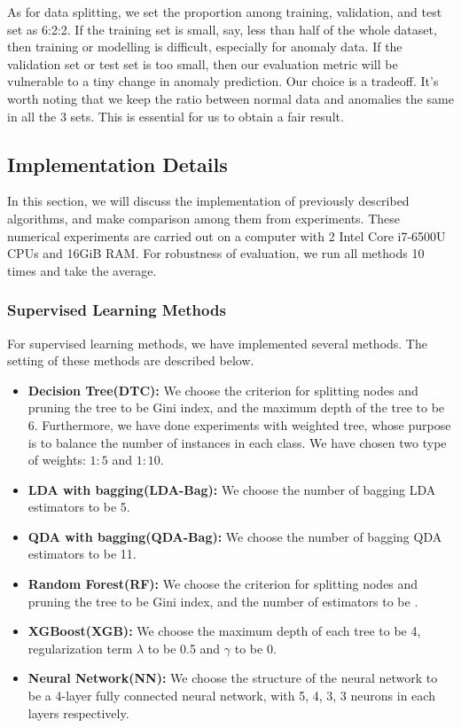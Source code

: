 \documentclass[english]{article}
\begin{document}
\par As for data splitting, we set the proportion among training, validation, and test set as 6:2:2. If the training set is small, say, less than half of the whole dataset, then training or modelling is difficult, especially for anomaly data. If the validation set or test set is too small, then our evaluation metric will be vulnerable to a tiny change in anomaly prediction. Our choice is a tradeoff. It's worth noting that we keep the ratio between normal data and anomalies the same in all the 3 sets. This is essential for us to obtain a fair result.

\subsection{Implementation Details}
\par In this section, we will discuss the implementation of previously described algorithms, and make comparison among them from experiments. These numerical experiments are carried out on a computer with 2 Intel Core i7-6500U CPUs and 16GiB RAM. For robustness of evaluation, we run all methods 10 times and take the average.

\subsubsection{Supervised Learning Methods}
\par For supervised learning methods, we have implemented several methods. The setting of these methods are described below.
\begin{itemize}
	\item\textbf{Decision Tree(DTC): } We choose the criterion for splitting nodes and pruning the tree to be Gini index, and the maximum depth of the tree to be 6. Furthermore, we have done experiments with weighted tree, whose purpose is to balance the number of instances in each class. We have chosen two type of weights: $1:5$ and $1:10$.
	\item\textbf{LDA with bagging(LDA-Bag): }We choose the number of bagging LDA estimators to be 5.
	\item\textbf{QDA with bagging(QDA-Bag): }We choose the number of bagging QDA estimators to be 11.
	\item\textbf{Random Forest(RF): } We choose the criterion for splitting nodes and pruning the tree to be Gini index, and the number of estimators to be .
	\item\textbf{XGBoost(XGB): }We choose the maximum depth of each tree to be 4, regularization term $\lambda$ to be 0.5 and $\gamma$ to be 0.
	\item\textbf{Neural Network(NN): }We choose the structure of the neural network to be a 4-layer fully connected neural network, with 5, 4, 3, 3 neurons in each layers respectively.
\end{itemize}
\end{document}
